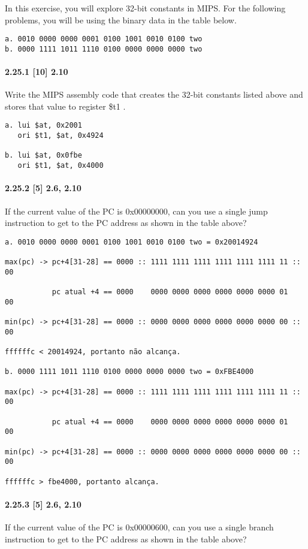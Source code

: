 \documentclass{article}
\begin{document}
In this exercise, you will explore 32-bit constants in MIPS. For the following 
problems, you will be using the binary data in the table below.

\begin{verbatim}
a. 0010 0000 0000 0001 0100 1001 0010 0100 two
b. 0000 1111 1011 1110 0100 0000 0000 0000 two
\end{verbatim}

\paragraph{2.25.1  [10] 2.10} Write the MIPS assembly code that creates the 
32-bit constants listed above and stores that value to register \$t1 .

\begin{verbatim}
a. lui $at, 0x2001
   ori $t1, $at, 0x4924

b. lui $at, 0x0fbe
   ori $t1, $at, 0x4000
\end{verbatim}

\paragraph{2.25.2 [5] 2.6, 2.10} If the current value of the PC is 0x00000000, 
can you use a single jump instruction to get to the PC address as shown in the 
table above?

\begin{verbatim}
a. 0010 0000 0000 0001 0100 1001 0010 0100 two = 0x20014924

max(pc) -> pc+4[31-28] == 0000 :: 1111 1111 1111 1111 1111 1111 11 :: 00

           pc atual +4 == 0000    0000 0000 0000 0000 0000 0000 01    00

min(pc) -> pc+4[31-28] == 0000 :: 0000 0000 0000 0000 0000 0000 00 :: 00

ffffffc < 20014924, portanto não alcança.

b. 0000 1111 1011 1110 0100 0000 0000 0000 two = 0xFBE4000

max(pc) -> pc+4[31-28] == 0000 :: 1111 1111 1111 1111 1111 1111 11 :: 00

           pc atual +4 == 0000    0000 0000 0000 0000 0000 0000 01    00

min(pc) -> pc+4[31-28] == 0000 :: 0000 0000 0000 0000 0000 0000 00 :: 00

ffffffc > fbe4000, portanto alcança.
\end{verbatim}

\paragraph{2.25.3 [5] 2.6, 2.10} If the current value of the PC is 0x00000600, 
can you use a single branch instruction to get to the PC address as shown in 
the table above?
\end{document}

